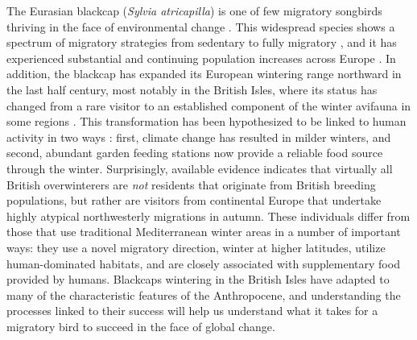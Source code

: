 \documentclass[a4paper, nobind]{templates/ociamthesis}
\begin{document}
The Eurasian blackcap (\emph{Sylvia atricapilla}) is one of few migratory songbirds thriving in the face of environmental change \autocite{ebcc/birdlife/rspb/csoTrendsCommonBirds2018}. This widespread species shows a spectrum of migratory strategies from sedentary to fully migratory \autocite{crampSylviaAtricapillaBlackcap1992}, and it has experienced substantial and continuing population increases across Europe \autocite[+155\% since 1980;][]{ebcc/birdlife/rspb/csoTrendsCommonBirds2018}. In addition, the blackcap has expanded its European wintering range northward in the last half century, most notably in the British Isles, where its status has changed from a rare visitor to an established component of the winter avifauna in some regions \autocite{franssonWinteringBlackcapsSylvia1994,fouargePointCasHivernage1980,johansenVinterforekomstAfMunk2002,bearhopAssortativeMatingMechanism2005,bertholdMigratoryBehaviourPopulation1988,bertholdRapidMicroevolutionMigratory1992,leachWinteringBlackcapsBritain1981}. This transformation has been hypothesized to be linked to human activity in two ways \autocite{bertholdMigratoryBehaviourPopulation1988,plummerSupplementaryFeedingGardens2015}: first, climate change has resulted in milder winters, and second, abundant garden feeding stations now provide a reliable food source through the winter. Surprisingly, available evidence \autocites[Chapter \ref{blackcap-geo};][]{bertholdRapidMicroevolutionMigratory1992}{plummerSupplementaryFeedingGardens2015}{wernhamMigrationAtlasMovements2002} indicates that virtually all British overwinterers are \emph{not} residents that originate from British breeding populations, but rather are visitors from continental Europe that undertake highly atypical northwesterly migrations in autumn. These individuals differ from those that use traditional Mediterranean winter areas in a number of important ways: they use a novel migratory direction, winter at higher latitudes, utilize human-dominated habitats, and are closely associated with supplementary food provided by humans. Blackcaps wintering in the British Isles have adapted to many of the characteristic features of the Anthropocene, and understanding the processes linked to their success will help us understand what it takes for a migratory bird to succeed in the face of global change.
\end{document}
